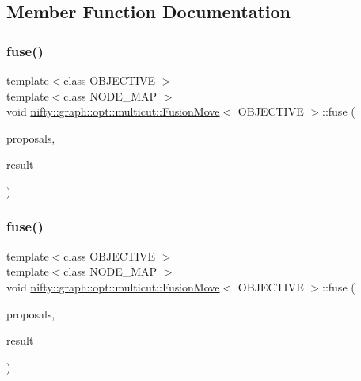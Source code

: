 \subsection{Member Function Documentation}
\mbox{\label{classnifty_1_1graph_1_1opt_1_1multicut_1_1FusionMove_a4ed48452a9c5d480b9e8c09a6ec74905}} 
\subsubsection{\texorpdfstring{fuse()}{fuse()}\hspace{0.1cm}{\footnotesize\ttfamily [1/2]}}
{\footnotesize\ttfamily template$<$class O\+B\+J\+E\+C\+T\+I\+VE $>$ \\
template$<$class N\+O\+D\+E\+\_\+\+M\+AP $>$ \\
void \hyperlink{classnifty_1_1graph_1_1opt_1_1multicut_1_1FusionMove}{nifty\+::graph\+::opt\+::multicut\+::\+Fusion\+Move}$<$ O\+B\+J\+E\+C\+T\+I\+VE $>$\+::fuse (\begin{DoxyParamCaption}\item[{std\+::initializer\+\_\+list$<$ const N\+O\+D\+E\+\_\+\+M\+AP $\ast$$>$}]{proposals,  }\item[{N\+O\+D\+E\+\_\+\+M\+AP $\ast$}]{result }\end{DoxyParamCaption})\hspace{0.3cm}{\ttfamily [inline]}}

\mbox{\label{classnifty_1_1graph_1_1opt_1_1multicut_1_1FusionMove_a87e522e6d4cb2a40544be4f2a05cb49c}} 
\subsubsection{\texorpdfstring{fuse()}{fuse()}\hspace{0.1cm}{\footnotesize\ttfamily [2/2]}}
{\footnotesize\ttfamily template$<$class O\+B\+J\+E\+C\+T\+I\+VE $>$ \\
template$<$class N\+O\+D\+E\+\_\+\+M\+AP $>$ \\
void \hyperlink{classnifty_1_1graph_1_1opt_1_1multicut_1_1FusionMove}{nifty\+::graph\+::opt\+::multicut\+::\+Fusion\+Move}$<$ O\+B\+J\+E\+C\+T\+I\+VE $>$\+::fuse (\begin{DoxyParamCaption}\item[{const std\+::vector$<$ const N\+O\+D\+E\+\_\+\+M\+AP $\ast$$>$ \&}]{proposals,  }\item[{N\+O\+D\+E\+\_\+\+M\+AP $\ast$}]{result }\end{DoxyParamCaption})\hspace{0.3cm}{\ttfamily [inline]}}



